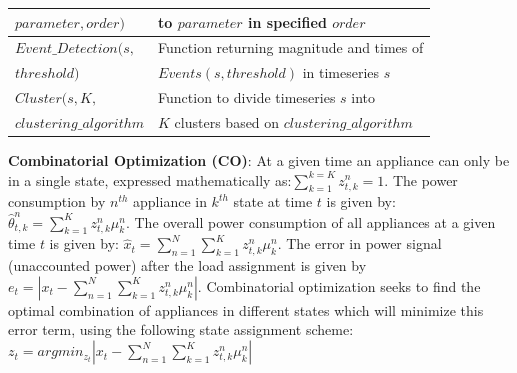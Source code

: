 \documentclass[conference]{IEEEtran}
\begin{document}
\begin{table}[ht!]
\begin{tabular}{|l|l|}
$parameter,order)$  &to $parameter$ in specified $order$\\[0.1cm]
\hline
$Event\_Detection(s,$ & Function returning magnitude and times of \\[0.1cm]
$threshold)$                  &$Events(s,threshold)$ in timeseries $s$\\[0.1cm]
\hline
$Cluster(s,K,$& Function to divide timeseries $s$ into\\[0.1cm]
$clustering\_algorithm$&$K$ clusters based on $clustering\_algorithm$ \\
\hline

                             
                                                                               

\hline
%
\end{tabular}
\vspace{-8pt}
\end{table}

\noindent \textbf{Combinatorial Optimization (CO)}: At a given time an appliance can only be in a single state, expressed mathematically as:$\sum\limits_{k=1}^{k=K} z_{t,k}^n=1$. The power consumption by $n^{th}$ appliance in $k^{th}$ state at time $t$ is given by: $\hat{\theta}^n_{t,k}=\sum\limits_{k=1}^{K} z_{t,k}^n \mu_k^n$. The overall power consumption of all appliances at a given time $t$ is given by: $\hat{x}_{t}=\sum\limits_{n=1}^{N}\sum\limits_{k=1}^{K} z_{t,k}^n \mu_k^n$. The error in power signal (unaccounted power) after the load assignment is given by $e_t=|x_t-\sum\limits_{n=1}^{N}\sum\limits_{k=1}^{K}z_{t,k}^n\mu_k^n|$. Combinatorial optimization seeks to find the optimal combination of appliances in different states which will minimize this error term, using the following state assignment scheme:
\vspace{-1mm}
$z_t=arg min_{z_t}|x_t-\sum\limits_{n=1}^{N}\sum\limits_{k=1}^{K}z_{t,k}^n\mu_k^n|$
\vspace{-1mm}
\end{document}
